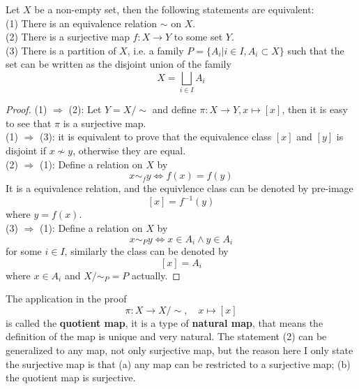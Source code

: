 \documentclass[12pt,a4paper]{article}
\begin{document}
\begin{lemma}
    Let \(X\) be a non-empty set, then the following statements are equivalent:\\

    (1) There is an equivalence relation \(\sim\) on \(X\).\\

    (2) There is a surjective map \(f: X \to Y\) to some set \(Y\).\\

    (3) There is a partition of \(X\), i.e. a family \(P = \{A_i| i\in I, A_i \subset X\}\) such that the set can be written as the disjoint union of the family
    \[X = \bigsqcup_{i \in I} A_i\]
\end{lemma}
\begin{proof}
    (1) \(\Rightarrow\) (2): Let \(Y = X/\sim\) and define \(\pi: X \to Y, x \mapsto [x]\), then it is easy to see that \(\pi\) is a surjective map.\\

    (1) \(\Rightarrow\) (3): it is equivalent to prove that the equivalence class \([x]\) and \([y]\) is disjoint if \(x \nsim y\), otherwise they are equal.\\

    (2) \(\Rightarrow\) (1): Define a relation on \(X\) by
    \[x \sim_f y \iff f(x) = f(y)\]
    It is a equivalence relation, and the equivlence class can be denoted by pre-image 
    \[[x] = f^{-1}(y)  \]
    where \(y = f(x)\).\\

    (3) \(\Rightarrow\) (1): Define a relation on \(X\) by 
    \[x \sim_P y \iff x\in A_i \wedge y \in A_i\]
    for some \(i \in I\), similarly the class can be denoted by
    \[[x] = A_i\]
    where \(x \in A_i\) and \(X/\sim_P = P\) actually.
\end{proof}

The application in the proof
\[\pi: X \to X/\sim, \quad x \mapsto [x]\]
is called the \textbf{quotient map}, it is a type of \textbf{natural map}, that means the definition of the map is unique and very natural. The statement (2) can be generalized to any map, not only surjective map, but the reason here I only state the surjective map is that (a) any map can be restricted to a surjective map; (b) the quotient map is surjective. 
\end{document}
